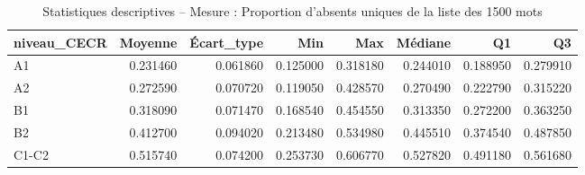 \begin{table}
\caption{Statistiques descriptives – Mesure : Proportion d'absents uniques de la liste des 1500 mots}
\label{tab:stats_PA_SUBTLEX_1500_U}
\begin{tabular}{lrrrrrrr}
\toprule
niveau_CECR & Moyenne & Écart_type & Min & Max & Médiane & Q1 & Q3 \\
\midrule
A1 & 0.231460 & 0.061860 & 0.125000 & 0.318180 & 0.244010 & 0.188950 & 0.279910 \\
A2 & 0.272590 & 0.070720 & 0.119050 & 0.428570 & 0.270490 & 0.222790 & 0.315220 \\
B1 & 0.318090 & 0.071470 & 0.168540 & 0.454550 & 0.313350 & 0.272200 & 0.363250 \\
B2 & 0.412700 & 0.094020 & 0.213480 & 0.534980 & 0.445510 & 0.374540 & 0.487850 \\
C1-C2 & 0.515740 & 0.074200 & 0.253730 & 0.606770 & 0.527820 & 0.491180 & 0.561680 \\
\bottomrule
\end{tabular}
\end{table}
